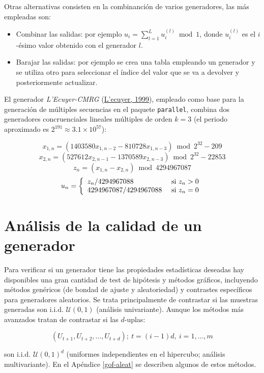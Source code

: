 \documentclass[
]{book}
\theoremstyle{break}
\theoremstyle{nonumberplain}
\begin{document}
Otras alternativas consisten en la combinanción de varios generadores, las más empleadas son:

\begin{itemize}
\item
  Combinar las salidas: por ejemplo \(u_{i}=\sum_{l=1}^L u_{i}^{(l)} \bmod 1\), donde \(u_{i}^{(l)}\) es el \(i\)-ésimo valor obtenido con el generador \(l\).
\item
  Barajar las salidas: por ejemplo se crea una tabla empleando un generador y se utiliza otro para seleccionar el índice del valor que se va a devolver y posteriormente actualizar.
\end{itemize}

El generador \emph{L'Ecuyer-CMRG} (\protect\hyperlink{ref-lecuyer99}{L'ecuyer, 1999}), empleado como base para la generación de múltiples secuencias en el paquete \texttt{parallel}, combina dos generadores concruenciales lineales múltiples de orden \(k=3\) (el periodo aproximado es \(2^{191} \approx 3.1 \times 10^{57}\)):

\[x_{1,n} = (1403580 x_{1,n−2} − 810728 x_{1,n−3}) \bmod  2^{32} − 209\]
\[x_{2,n} = (527612 x_{2,n−1} − 1370589 x_{2,n−3}) \bmod  2^{32} − 22853\]
\[z_n = (x_{1,n} − x_{2,n}) \bmod  4294967087\]
\[
u_n =
\left\{
\begin{array}[c]{ll}
z_n/4294967088 & \text{ si } z_n > 0\\
4294967087/4294967088 & \text{ si } z_n = 0
\end{array}
\right.
\]

\hypertarget{calgen}{%
\section{Análisis de la calidad de un generador}\label{calgen}}

Para verificar si un generador tiene las propiedades estadísticas deseadas hay disponibles una gran cantidad de test de hipótesis y métodos gráficos,
incluyendo métodos genéricos (de bondad de ajuste y aleatoriedad) y contrastes específicos para generadores aleatorios.
Se trata principalmente de contrastar si las muestras generadas son i.i.d. \(\mathcal{U}\left(0,1\right)\) (análisis univariante).
Aunque los métodos más avanzados tratan de contrastar si las \(d\)-uplas:

\[(U_{t+1},U_{t+2},\ldots,U_{t+d}); \ t=(i-1)d, \ i=1,\ldots,m\]

son i.i.d. \(\mathcal{U}\left(0,1\right)^{d}\) (uniformes independientes en el hipercubo; análisis multivariante).
En el Apéndice \ref{gof-aleat} se describen algunos de estos métodos.
\end{document}
